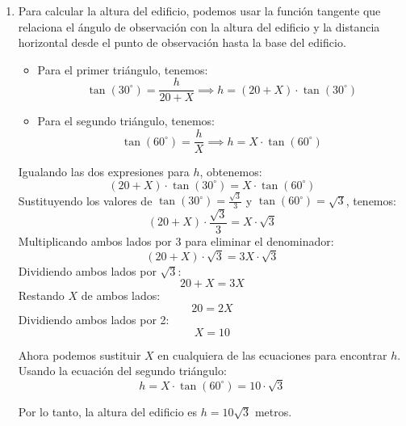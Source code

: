 \documentclass[12pt]{article}
\begin{document}
\begin{enumerate}
\begin{enumerate}
    \item Para calcular la altura del edificio, podemos usar la función tangente que relaciona el ángulo de observación con la altura del edificio y la distancia horizontal desde el punto de observación hasta la base del edificio.
    \begin{itemize}
        \item Para el primer triángulo, tenemos:
        \begin{equation*}
            \tan(30^{\circ}) = \frac{h}{20 + X} \implies h = (20 + X) \cdot \tan(30^{\circ})
        \end{equation*}
        \item Para el segundo triángulo, tenemos:
        \begin{equation*}
            \tan(60^{\circ}) = \frac{h}{X} \implies h = X \cdot \tan(60^{\circ})
        \end{equation*}
   \end{itemize}
   Igualando las dos expresiones para $h$, obtenemos:
    \begin{equation*}
          (20 + X) \cdot \tan(30^{\circ}) = X \cdot \tan(60^{\circ})
     \end{equation*}
     Sustituyendo los valores de $\tan(30^{\circ}) = \frac{\sqrt{3}}{3}$ y $\tan(60^{\circ}) = \sqrt{3}$, tenemos:
     \begin{equation*}
          (20 + X) \cdot \frac{\sqrt{3}}{3} = X \cdot \sqrt{3}
     \end{equation*}
     Multiplicando ambos lados por 3 para eliminar el denominador:
     \begin{equation*}
          (20 + X) \cdot \sqrt{3} = 3X \cdot \sqrt{3}
     \end{equation*}
     Dividiendo ambos lados por $\sqrt{3}$:
     \begin{equation*}
          20 + X = 3X
     \end{equation*}
     Restando $X$ de ambos lados:
     \begin{equation*}
          20 = 2X
     \end{equation*}
     Dividiendo ambos lados por 2:
     \begin{equation*}
          X = 10
     \end{equation*}
     
     Ahora podemos sustituir $X$ en cualquiera de las ecuaciones para encontrar $h$. Usando la ecuación del segundo triángulo:
     \begin{equation*}
          h = X \cdot \tan(60^{\circ}) = 10 \cdot \sqrt{3} 
     \end{equation*}
     
     Por lo tanto, la altura del edificio es $h = 10\sqrt{3}$ metros.


\end{enumerate}
    
        
\end{enumerate}
\end{document}
